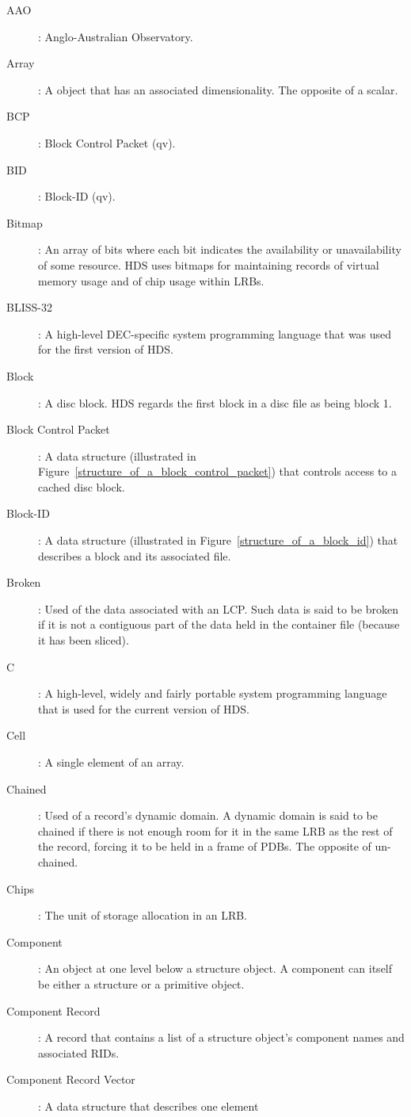 \begin {description}                       
\item [AAO]: Anglo-Australian Observatory.
\item [Array]: A object that has an associated dimensionality. The opposite
of a scalar.
\item [BCP]: Block Control Packet (qv).
\item [BID]: Block-ID (qv).
\item [Bitmap]: An array of bits where each bit indicates the availability or
unavailability of some resource. HDS uses bitmaps for maintaining records
of virtual memory usage and of chip usage within LRBs.
\item [BLISS-32]: A high-level DEC-specific system programming language that
was used for the first version of HDS.
\item [Block]: A disc block. HDS regards the first block in a disc file as
being block 1.
\item [Block Control Packet]: A data structure (illustrated in
Figure~\ref{structure_of_a_block_control_packet}) that controls access to a
cached disc block.
\item [Block-ID]: A data structure (illustrated in
Figure~\ref{structure_of_a_block_id}) that describes a block and its associated
file. 
\item [Broken]: Used of the data associated with an LCP. Such data is said
to be broken if it is not a contiguous part of the data held in the container
file (because it has been sliced).
\item [C]: A high-level, widely and fairly portable system programming language
that is used for the current version of HDS.
\item [Cell]: A single element of an array.
\item [Chained]: Used of a record's dynamic domain. A dynamic domain is said
to be chained if there is not enough room for it in the same LRB as the
rest of the record, forcing it to be held in a frame of PDBs. The opposite
of un-chained.   
\item [Chips]: The unit of storage allocation in an LRB.
\item [Component]: An object at one level below a structure object. A component
can itself be either a structure or a primitive object.
\item [Component Record]: A record that contains a list of a structure object's
component names and associated RIDs.
\item [Component Record Vector]: A data structure that describes one element

\end{description}
